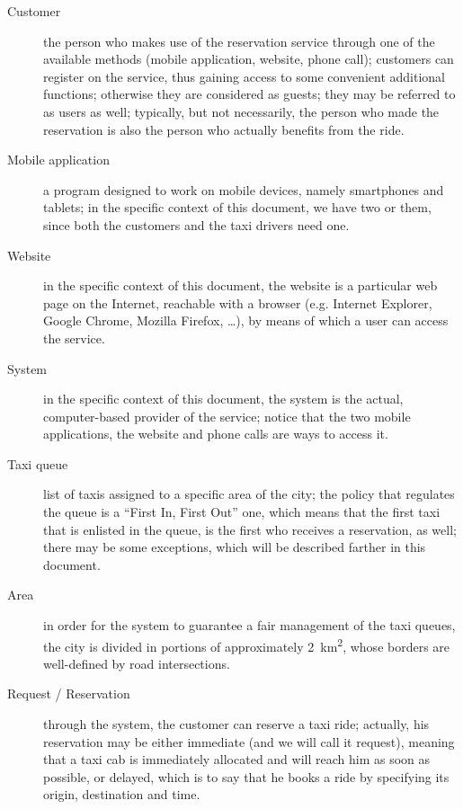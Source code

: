 \begin{description}
	\item [Customer] the person who makes use of the reservation service through one of the available methods (mobile application, website, phone call); customers can register on the service, thus gaining access to some convenient additional functions; otherwise they are considered as guests; they may be referred to as users as well; typically, but not necessarily, the person who made the reservation is also the person who actually benefits from the ride.
	\item [Mobile application] a program designed to work on mobile devices, namely smartphones and tablets; in the specific context of this document, we have two or them, since both the customers and the taxi drivers need one.
	\item [Website] in the specific context of this document, the website is a particular web page on the Internet, reachable with a browser (e.g. Internet Explorer, Google Chrome, Mozilla Firefox, \dots), by means of which a user can access the service.
	\item [System] in the specific context of this document, the system is the actual, computer-based provider of the service; notice that the two mobile applications, the website and phone calls are ways to access it.  
	\item [Taxi queue] list of taxis assigned to a specific area of the city; the policy that regulates the queue is a ``First In, First Out'' one, which means that the first taxi that is enlisted in the queue, is the first who receives a reservation, as well; there may be some exceptions, which will be described farther in this document.
	\item [Area] in order for the system to guarantee a fair management of the taxi queues, the city is divided in portions of approximately \SI{2}{\square\kilo\meter}, whose borders are well-defined by road intersections.
	\item [Request / Reservation] through the system, the customer can reserve a taxi ride; actually, his reservation may be either immediate (and we will call it request), meaning that a taxi cab is immediately allocated and will reach him as soon as possible, or delayed, which is to say that he books a ride by specifying its origin, destination and time.
\end{description}


